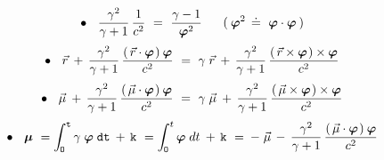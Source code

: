 \documentclass[10pt,fleqn]{article}
\begin{document}
\newpage

\noindent\begin{eqnarray*}
\hspace{-2.60em} \bullet \hspace{+0.90em} \dfrac{\gamma^2}{\gamma + 1} \, \dfrac{1}{c^2} ~=~ \dfrac{\gamma - 1}{\boldsymbol{\varphi}^2} \hspace{+1.68em} ( \: \boldsymbol{\varphi}^2 \,\doteq~ \boldsymbol{\varphi} \cdot \boldsymbol{\varphi} \: )
\end{eqnarray*}
\medskip
\begin{eqnarray*}
\hspace{-2.60em} \bullet \hspace{+0.90em} \vec{r} \: + \, \frac{\gamma^2}{\gamma + 1} \, \frac{(\hspace{+0.15em} \vec{r} \cdot \boldsymbol{\varphi} \hspace{+0.09em}) \: \boldsymbol{\varphi}}{c^2} ~=~ \gamma \; \vec{r} \: + \, \frac{\gamma^2}{\gamma + 1} \, \frac{(\hspace{+0.15em} \vec{r} \times \boldsymbol{\varphi} \hspace{+0.09em}) \times \boldsymbol{\varphi}}{c^2}
\end{eqnarray*}
\medskip
\begin{eqnarray*}
\hspace{-2.60em} \bullet \hspace{+0.90em} \vec{\mu} \: + \, \frac{\gamma^2}{\gamma + 1} \, \frac{(\hspace{+0.15em} \vec{\mu} \cdot \boldsymbol{\varphi} \hspace{+0.09em}) \: \boldsymbol{\varphi}}{c^2} ~=~ \gamma \; \vec{\mu} \: + \, \frac{\gamma^2}{\gamma + 1} \, \frac{(\hspace{+0.15em} \vec{\mu} \times \boldsymbol{\varphi} \hspace{+0.09em}) \times \boldsymbol{\varphi}}{c^2}
\end{eqnarray*}
\medskip
\begin{eqnarray*}
\hspace{-2.60em} \bullet \hspace{+0.90em} \boldsymbol{\mu} ~= \int_{\hspace{-0.045em}\mathtt{O}}^{\mathtt{t}} \gamma \; \boldsymbol{\varphi} \; \mathtt{dt} \: + \, \mathtt{k} ~= \int_{\hspace{-0.045em}\mathtt{O}}^{t} \boldsymbol{\varphi} \; dt \: + \, \mathtt{k} ~=\: - \; \vec{\mu} \, - \, \frac{\gamma^2}{\gamma + 1} \, \frac{(\hspace{+0.15em} \vec{\mu} \cdot \boldsymbol{\varphi} \hspace{+0.09em}) \: \boldsymbol{\varphi}}{c^2}
\end{eqnarray*}
\end{document}
